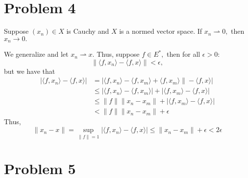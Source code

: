 \documentclass[11pt]{article}
\begin{document}
\newpage
\section*{Problem 4}
\begin{problem}
    Suppose $(x_n) \in X$ is Cauchy and $X$ is a normed vector space. If $x_n \rightharpoonup 0,$ then $x_n \to 0.$
\end{problem}
\begin{solution}
    We generalize and let $x_n \rightharpoonup x.$ Thus, suppose $f\in E^*,$ then for all $\epsilon>0:$
    \[\|\langle f, x_n \rangle - \langle f, x\rangle\| <\epsilon,\] but we have that
    \begin{align*}
        |\langle f, x_n \rangle - \langle f, x\rangle|
        &= |\langle f, x_n \rangle -\langle f, x_m \rangle + \langle f, x_m\rangle\| - \langle f, x\rangle|\\
        &\leq |\langle f, x_n \rangle -\langle f, x_m \rangle| + |\langle f, x_m\rangle - \langle f, x\rangle|\\
        &\leq \|f\|\|x_n - x_m\| + |\langle f, x_m\rangle - \langle f, x\rangle|\\
        &< \|f\|\|x_n - x_m\| + \epsilon
    \end{align*}
    Thus,
    \[\|x_n - x\| = \sup_{\|f\| = 1}|\langle f, x_n \rangle - \langle f, x\rangle| \leq \|x_n - x_m\| + \epsilon< 2\epsilon\]
\end{solution}

\newpage
\section*{Problem 5}
\begin{problem}
    
\end{problem}

\newpage
\end{document}
